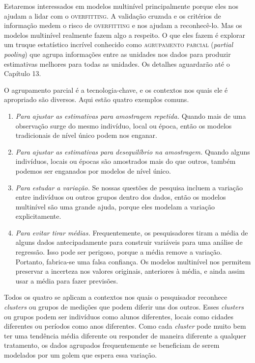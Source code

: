 Estaremos interessados em modelos multinível principalmente porque eles nos ajudam a lidar com o \textsc{overfitting}. A validação cruzada e os critérios de informação medem o risco de \textsc{overfitting} e nos ajudam a reconhecê-lo. Mas os modelos multinível realmente fazem algo a respeito. O que eles fazem é explorar um truque estatístico incrível conhecido como \textsc{agrupamento parcial} (\textit{partial pooling}) que agrupa informações entre as unidades nos dados para produzir estimativas melhores para todas as unidades. Os detalhes aguardarão até o Capítulo 13.

O agrupamento parcial é a tecnologia-chave, e os contextos nos quais ele é apropriado são diversos. Aqui estão quatro exemplos comuns.

\begin{enumerate}
  \item \textit{Para ajustar as estimativas para amostragem repetida.} Quando mais de uma observação surge do mesmo indivíduo, local ou época, então os modelos tradicionais de nível único podem nos enganar.
  \item \textit{Para ajustar as estimativas para desequilíbrio na amostragem.} Quando alguns indivíduos, locais ou épocas são amostrados mais do que outros, também podemos ser enganados por modelos de nível único.
  \item \textit{Para estudar a variação.} Se nossas questões de pesquisa incluem a variação entre indivíduos ou outros grupos dentro dos dados, então os modelos multinível são uma grande ajuda, porque eles modelam a variação explicitamente.
  \item \textit{Para evitar tirar médias.} Frequentemente, os pesquisadores tiram a média de alguns dados antecipadamente para construir variáveis para uma análise de regressão. Isso pode ser perigoso, porque a média remove a variação. Portanto, fabrica-se uma falsa confiança. Os modelos multinível nos permitem preservar a incerteza nos valores originais, anteriores à média, e ainda assim usar a média para fazer previsões.
\end{enumerate}

Todos os quatro se aplicam a contextos nos quais o pesquisador reconhece \textit{clusters} ou grupos de medições que podem diferir uns dos outros. Esses \textit{clusters} ou grupos podem ser indivíduos como alunos diferentes, locais como cidades diferentes ou períodos como anos diferentes. Como cada \textit{cluster} pode muito bem ter uma tendência média diferente ou responder de maneira diferente a qualquer tratamento, os dados agrupados frequentemente se beneficiam de serem modelados por um golem que espera essa variação.

